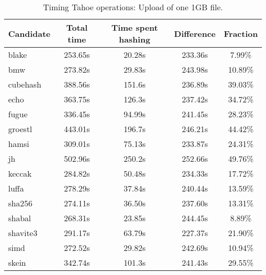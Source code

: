 \begin{table}[h]
  \centering
  \begin{tabular}{ | l | c | c | c | c | }
    \hline
    Candidate & Total time & Time spent hashing & Difference & Fraction \\ \hline
    blake & 253.65s & 20.28s & 233.36s & 7.99\% \\ \hline
    bmw & 273.82s & 29.83s & 243.98s & 10.89\% \\ \hline
    cubehash & 388.56s & 151.6s & 236.89s & 39.03\% \\ \hline
    echo & 363.75s & 126.3s & 237.42s & 34.72\% \\ \hline
    fugue & 336.45s & 94.99s & 241.45s & 28.23\% \\ \hline
    groestl & 443.01s & 196.7s & 246.21s & 44.42\% \\ \hline
    hamsi & 309.01s & 75.13s & 233.87s & 24.31\% \\ \hline
    jh & 502.96s & 250.2s & 252.66s & 49.76\% \\ \hline
    keccak & 284.82s & 50.48s & 234.33s & 17.72\% \\ \hline
    luffa & 278.29s & 37.84s & 240.44s & 13.59\% \\ \hline
    sha256 & 274.11s & 36.50s & 237.60s & 13.31\% \\ \hline
    shabal & 268.31s & 23.85s & 244.45s & 8.89\% \\ \hline
    shavite3 & 291.17s & 63.79s & 227.37s & 21.90\% \\ \hline
    simd & 272.52s & 29.82s & 242.69s & 10.94\% \\ \hline
    skein & 342.74s & 101.3s & 241.43s & 29.55\% \\ \hline
  \end{tabular}
  \caption{Timing Tahoe operations: Upload of one 1GB file.}
  \label{tbl:hashingtimes:put1gb}
\end{table}

